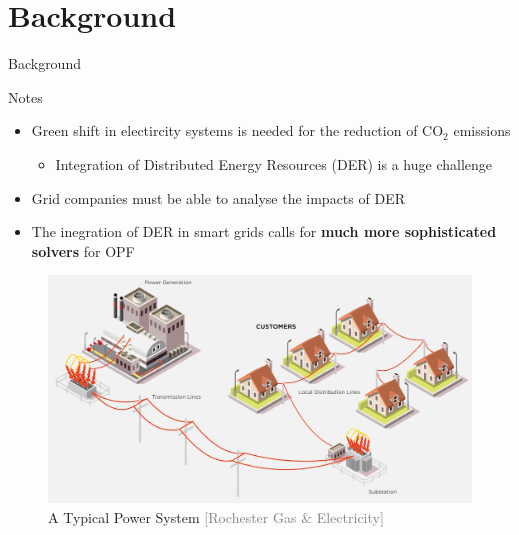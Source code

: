 \documentclass{beamer}
\begin{document}
\section{Background}
\begin{frame}{Background}
\begin{block}{Notes}
\begin{itemize}
\item <1-> Green shift in electircity systems is needed for the reduction of $\mathrm{CO_2}$ emissions
\begin{itemize}
\item<2-> Integration of Distributed Energy Resources (DER) is a huge challenge
\end{itemize}
\item<3-> Grid companies must be able to analyse the impacts of DER 
\item<5-> The inegration of DER in smart grids calls for \textbf{much more sophisticated solvers} for OPF
\end{itemize}
\end{block}
\begin{figure}
\includegraphics[scale=0.1]{Figures/PowerSys.png}
 \caption{A Typical Power System \textcolor{gray}{\tiny[Rochester Gas \& Electricity]}}
\end{figure}

\end{frame}
\end{document}
